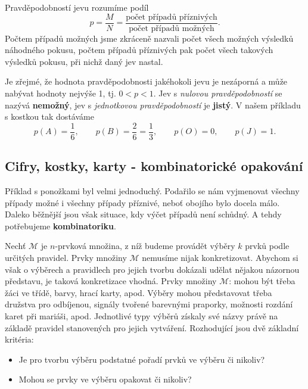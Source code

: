 {      \begin{definition}
        Pravděpodobností jevu rozumíme podíl
        \begin{equation}\label{mai:eq011}
          p = \frac{M}{N} = \frac{\text{počet případů příznivých}}{\text{počet případů možných}}.
        \end{equation}  
        Počtem případů možných jsme zkráceně nazvali počet všech možných výsledků náhodného 
        pokusu, počtem případů příznivých pak počet všech takových výsledků pokusu, při nichž daný 
        jev nastal.
      \end{definition}
      Je zřejmé, že hodnota pravděpodobnosti jakéhokoli jevu je nezáporná a může nabývat hodnoty 
      nejvýše \num{1}, tj. \(0 <p< 1\). Jev s \emph{nulovou pravděpodobností} se nazývá 
      \textbf{nemožný}, jev s \emph{jednotkovou pravděpodobností} je \textbf{jistý}. V našem 
      příkladu s kostkou tak dostáváme
      \begin{equation*}
        p(A) = \frac{1}{6}, \qquad p(B) = \frac{2}{6} = \frac{1}{3}, \qquad
        p(O) = 0, \qquad p(J) = 1.
      \end{equation*}  

      
    \subsection{Cifry, kostky, karty - kombinatorické opakování}
      Příklad s ponožkami byl velmi jednoduchý. Podařilo se nám vyjmenovat všechny případy možné i 
      všechny případy příznivé, neboť obojího bylo docela málo. Daleko běžnější jsou však situace, 
      kdy výčet případů není schůdný. A tehdy potřebujeme \textbf{kombinatoriku}.
      
      Nechť \(\mathcal{M}\) je \(n\)-prvková množina, z níž budeme provádět výběry \(k\) prvků 
      podle určitých pravidel. Prvky množiny \(\mathcal{M}\) nemusíme nijak konkretizovat. Abychom 
      si však o výběrech a pravidlech pro jejich tvorbu dokázali udělat nějakou názornou představu, 
      je taková konkretizace vhodná. Prvky množiny \(\mathcal{M}\): mohou být třeba žáci ve třídě, 
      barvy, hrací karty, apod. Výběry mohou představovat třeba družstva pro odbíjenou, signály 
      tvořené barevnými praporky, možnosti rozdání karet při mariáši, apod. Jednotlivé typy výběrů 
      získaly své názvy právě na základě pravidel stanovených pro jejich vytváření. Rozhodující 
      jsou dvě základní kritéria:
      \begin{itemize}\addtolength{\itemsep}{-0.5\baselineskip}
        \item Je pro tvorbu výběru podstatné pořadí prvků ve výběru či nikoliv?
        \item Mohou se prvky ve výběru opakovat či nikoliv?
      \end{itemize}
      
}
